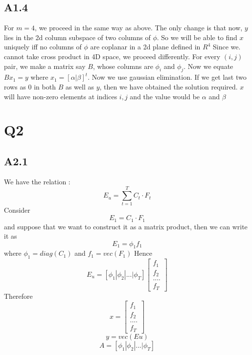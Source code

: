 \documentclass{article}
\begin{document}
\subsection*{A1.4}
For $m=4$, we proceed in the same way as above. The only change is that now, $y$ lies in the 2d column subspace of
two columns of $\phi$. So we will be able to find $x$ uniquely iff no columns of $\phi$ are coplanar in a 2d plane
defined in $R^4$
Since we. cannot take cross product in 4D space, we proceed differently. For every $(i,j)$ pair, we make a matrix say $B$,
whose columns are $\phi_i$ and $\phi_j$. Now we equate $Bx_1 = y$ where $x_1 = [\alpha | \beta]^t$. Now we use gaussian elimination.
If we get last two rows as 0 in both $B$ as well as $y$, then we have obtained the solution required. $x$ will have non-zero elements
at indices $i,j$ and the value would be $\alpha$ and $\beta$

\section*{Q2}
\subsection*{A2.1}

We have the relation : $$E_u = \sum_{t=1}^TC_t \cdot F_t$$
Consider $$E_1 = C_1 \cdot F_1$$ and suppose that we want to construct it as a matrix product, then we can write it as
$$E_1 = \phi_1 f_1$$ where $\phi_1 = diag(C_1)$ and $f_1 = vec(F_1)$
Hence $$E_u = [\phi_1 | \phi_2 |...| \phi_T] \begin{bmatrix}
  f_1\\ f_2 \\....\\ f_T \end{bmatrix} $$
Therefore $$x = \begin{bmatrix}
  f_1\\ f_2 \\....\\ f_T \end{bmatrix}$$
$$ y = vec(Eu)$$
$$A = [\phi_1 | \phi_2 |...| \phi_T]$$
\end{document}
